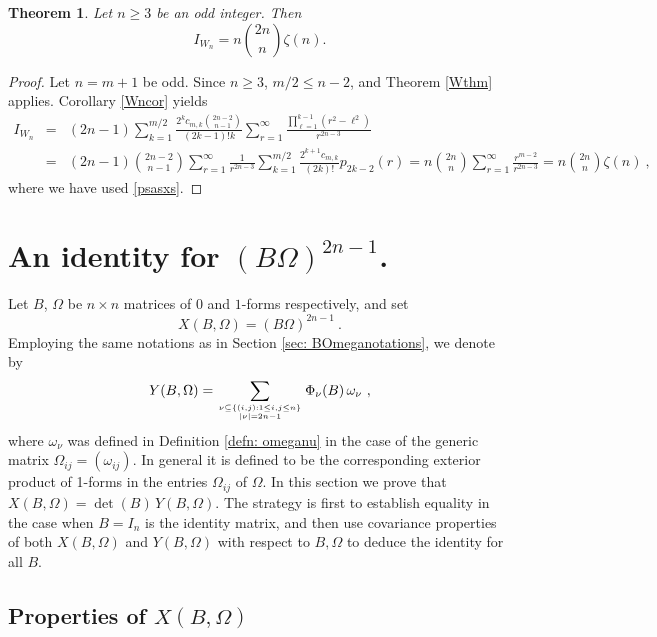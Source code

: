 \documentclass[10pt]{amsart}
\theoremstyle{plain}
\newtheorem{thm}{Theorem}
\newcommand{\0}{\color{blue}{\mathsf{0}}}
\begin{document}
\begin{thm}\label{themainthm}
Let $n\geq3$ be an odd integer. Then
\begin{equation}\label{IWeq3}
I_{W_n}=n\genfrac(){0pt}{}{2n}{n}\zeta(n).
\end{equation}
\end{thm}
\begin{proof}
Let $n=m+1$ be odd.  Since $n\geq3$,  $m/2 \leq n-2$, and  Theorem \ref{Wthm} applies.  Corollary \ref{Wncor} yields
\begin{eqnarray*}
I_{W_n} & = & (2n-1)\sum_{k=1}^{m/2} \frac{2^kc_{m,k}\genfrac(){0pt}{}{2n-2}{n-1}}{(2k-1)!k}\sum_{r=1}^\infty\frac{\prod_{\ell=1}^{k-1}(r^2-\ell^2)}{r^{2n-3}}\\
&=& (2n-1)\binom{2n-2}{n-1}  \sum_{r=1}^\infty \frac{1}{r^{2n-3}}  \sum_{k=1}^{m/2}\frac{2^{k+1}c_{m,k}}{(2k)!} p_{2k-2}(r)
=n\genfrac(){0pt}{}{2n}{n}\sum_{r=1}^\infty\frac{r^{m-2}}{r^{2n-3}} 
=n\genfrac(){0pt}{}{2n}{n}\zeta(n)\ ,\end{eqnarray*}
where we have used \eqref{psasxs}.
\end{proof}

\section{An identity \texorpdfstring{for $(B \Omega)^{2n-1}$.}{}} \label{Appendix1}
Let $B$, $\Omega$ be  $n\times n$ matrices of $0$ and $1$-forms respectively, and set 
\begin{equation}\label{Xdef}
X(B,\Omega) =  (B \Omega)^{2n-1} \ . 
\end{equation}
Employing the same notations as in Section \ref{sec: BOmeganotations}, we   denote by 
\begin{equation}\label{Ydef}
Y(B,\Omega)=\sum_{\genfrac{}{}{0pt}{}{\nu\subseteq \{(i,j): 1\leq i, j \leq n\}}{|\nu|=2n-1}}\Phi_{\nu}(B)\,\omega_\nu \ , 
\end{equation}
where $\omega_{\nu}$ was defined in Definition \ref{defn: omeganu} in the case of the generic matrix $\Omega_{ij}=(\omega_{ij})$. In general it is defined to be  the corresponding  exterior product of 1-forms in the entries $\Omega_{ij}$ of $\Omega$. In this section we prove that $X(B, \Omega) = \det(B)\, Y(B,\Omega)$. 
The strategy is first to establish  equality in  the case when $B=I_n$ is  the identity matrix, and then use covariance properties of both $X(B,\Omega)$ and $Y(B,\Omega)$ with respect to $B, \Omega$ to deduce the identity for all $B$.

\subsection{Properties of \texorpdfstring{$X(B,\Omega)$}{X}  }
\end{document}
